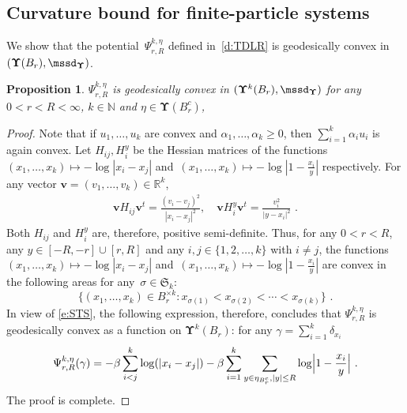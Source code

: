 \documentclass[11pt,letterpaper]{amsart}
\newcommand{\diff}{\mathop{}\!\mathrm{d}}
\newcommand{\N}{{\mathbb N}}
\newcommand{\R}{{\mathbb R}}
\newcommand{\comma}{\,\,\mathrm{,}\;\,}
\newcommand{\fstop}{\,\,\mathrm{.}}
\newcommand{\dUpsilon}{{\mathbf \Upsilon}}
\newcommand{\U}{\dUpsilon}
\newcommand{\sine}{\mathsf{sine}}
\renewcommand{\1}{\mathbf 1}
\numberwithin{equation}{section}
\theoremstyle{plain}
\newtheorem{prop}[thm]{Proposition}%
\theoremstyle{definition}
\theoremstyle{remark}
\begin{document}
\subsection{Curvature bound for finite-particle systems} \label{sec:CBFPS}
We show that the potential~$\Psi_{r, R}^{k, \eta}$ defined in~\eqref{d:TDLR} is geodesically convex in $(\U(B_r), \mssd_{\U})$. 
\begin{prop} \label{p:conv}
$\Psi_{r, R}^{k, \eta}$ is geodesically convex in $(\U^{k}(B_r), \mssd_{\U})$ for any $0<r<R<\infty$, $k \in \N$ and $\eta \in \U(B_r^c)$, 
\end{prop}
\begin{proof}
Note that if $u_1, \ldots, u_k$ are convex and $\alpha_1,\ldots, \alpha_k \ge 0$, then $\sum_{i=1}^k \alpha_iu_i$ is again convex.  
Let $H_{ij}, H_i^y$ be the Hessian matrices of the functions $(x_1, \ldots, x_k) \mapsto -\log |x_i-x_j|$ and~$(x_1, \ldots, x_k) \mapsto -\log|1-\frac{x_i}{y}|$ respectively. For any vector $\mathbf v=(v_1, \ldots, v_k) \in \R^{k}$, 
\begin{align} \label{e:HCP}
\mathbf v H_{ij} \mathbf v^t = \frac{(v_i-v_j)^2}{|x_i-x_j|^2}, \quad  \mathbf v H^y_{i} \mathbf v^t = \frac{v_i^2}{|y-x_i|^2} \fstop
\end{align}
Both $H_{ij}$ and $H_i^y$ are, therefore,  positive semi-definite. Thus, for any $0<r<R$, any $y \in [-R, -r] \cup [r, R]$ and any $i, j \in  \{1, 2, \ldots, k\}$ with $i \neq j$, the functions~$(x_1, \ldots, x_k) \mapsto -\log |x_i-x_j|$ and~$(x_1, \ldots, x_k) \mapsto -\log|1-\frac{x_i}{y}|$ are convex  in the following areas for any~$\sigma \in \mathfrak S_k$: 
$$\bigl\{(x_1, \ldots, x_k) \in B_r^{\times k}: x_{\sigma(1)} < x_{\sigma(2)}<\cdots <x_{\sigma(k)}\bigr\} \fstop$$ 
In view of \eqref{e:STS}, the following expression, therefore, concludes that $\Psi_{r, R}^{k, \eta}$ is geodesically convex as a function on $\U^k(B_r)$: for any $\gamma =\sum_{i=1}^k\delta_{x_i}$
\begin{align} \label{eq: conv}
\Psi_{r, R}^{k, \eta}(\gamma) = -\beta\sum_{i<j}^k \log (|x_i-x_j|) - \beta\sum_{i=1}^k \sum_{y \in \eta_{B_r^c}, |y| \le R} \log\Bigl|1-\frac{x_i}{y}\Bigr| \fstop
\end{align}
The proof is complete.
\end{proof}
\end{document}
